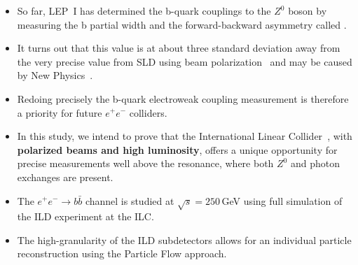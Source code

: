 

\begin{itemize}
	\item So far, LEP~I has determined the b-quark couplings to the $Z^0$ boson by measuring the b partial width and the forward-backward asymmetry called \afb.
	\item It turns out that this value is at about three standard deviation away from the very precise value from SLD using beam polarization~\cite{bib:AfbSMFit} and may be caused by New Physics~\cite{bib:RSTOP}.
	\item Redoing precisely the b-quark electroweak coupling measurement is therefore a priority for future $e^+e^-$ colliders. 
	
\end{itemize}

\begin{itemize}
	
	\item In this study, we intend to prove that the International Linear Collider~\cite{bib:ILC}, with \textbf{polarized beams and high luminosity}, offers a unique opportunity for precise measurements well above the resonance, where both $Z^0$ and photon exchanges are present. 
	\item {\color{Blue} The $e^+ e^-\to b\bar{b}$ channel is studied at $\sqrt{s}=250$\,GeV using full simulation of the ILD experiment at the ILC.}
	\item The high-granularity of the ILD subdetectors allows for an individual particle reconstruction using the Particle Flow approach.
\end{itemize}


